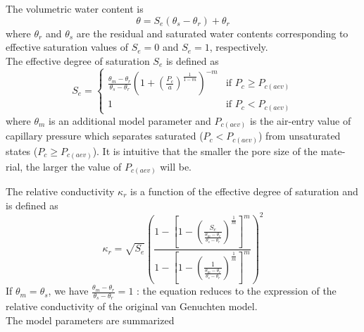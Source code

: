 \documentclass[a4paper]{article}
\begin{document}
The volumetric water content is 
\begin{equation}\label{latticetransmat7}
\theta = S_{e} (\theta_{s} - \theta_{r})+\theta_{r}
\end{equation}
where $\theta_{r}$ and $\theta_{s}$ are the residual and saturated water contents corresponding to effective saturation values of $S_{e} = 0$ and $S_{e} = 1$, respectively. \\

The effective degree of saturation $S_{e}$ is defined as
\begin{equation}\label{latticetransmat8}
S_{e}  = \left\{
    \begin{array}{ll}
         \frac{\theta_{m}-\theta_{r}}{\theta_{s}-\theta_{r}}\left(1+\left(\frac{ P_{c}}{a}\right)^{\frac{1}{1-m}}\right)^{-m}  & \mbox{if } P_{c} \ge P_{c(aev)} \\
         1 & \mbox{if } P_{c}<P_{c(aev)}
    \end{array}
\right.
\end{equation}
where $\theta_{m}$ is an additional model parameter and $P_{c(aev)}$ is the air-entry value of capillary pressure which separates saturated ($P_{c}<P_{c(aev)}$) from unsaturated states ($P_{c} \ge P_{c(aev)}$). It is intuitive that the smaller the pore size of the mate- rial, the larger the value of $P_{c(aev)}$ will be.

The relative conductivity $\kappa_{r}$ is a function of the effective degree of saturation and is defined as
\begin{equation}\label{latticetransmat9}
\kappa_{r}  = \sqrt{S_{e}}\left(\frac{1-\left[1-\left(\frac{S_{e}}{  \frac{\theta_{m}-\theta_{r}}{\theta_{s}-\theta_{r}}}\right)^{\frac{1}{m}}\right]^{m}}{1-\left[1-\left(\frac{1}{  \frac{\theta_{m}-\theta_{r}}{\theta_{s}-\theta_{r}}}\right)^{\frac{1}{m}}\right]^{m}}\right)^{2}
\end{equation}
If $\theta_{m} = \theta_{s}$, we have $ \frac{\theta_{m}-\theta_{r}}{\theta_{s}-\theta_{r}}=1$ : the equation reduces to the expression of the relative conductivity of the original van Genuchten model.\\

The model parameters are summarized
\end{document}
